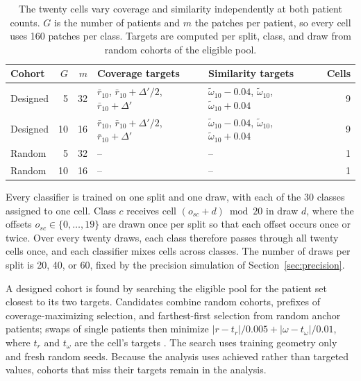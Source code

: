 \documentclass[11pt]{article}
\begin{document}
\begin{table}[htbp]
\centering
\renewcommand{\arraystretch}{1.15}
\begin{tabularx}{\textwidth}{@{}lrrYYr@{}}
\toprule
Cohort & $G$ & $m$ & Coverage targets & Similarity targets & Cells \\
\midrule
Designed & 5 & 32 & $\bar r_{10}$, $\bar r_{10}+\Delta'/2$, $\bar r_{10}+\Delta'$ & $\tilde\omega_{10}-0.04$, $\tilde\omega_{10}$, $\tilde\omega_{10}+0.04$ & 9 \\
Designed & 10 & 16 & $\bar r_{10}$, $\bar r_{10}+\Delta'/2$, $\bar r_{10}+\Delta'$ & $\tilde\omega_{10}-0.04$, $\tilde\omega_{10}$, $\tilde\omega_{10}+0.04$ & 9 \\
Random & 5 & 32 & -- & -- & 1 \\
Random & 10 & 16 & -- & -- & 1 \\
\bottomrule
\end{tabularx}
\caption{The twenty cells vary coverage and similarity independently at both patient counts. $G$ is the number of patients and $m$ the patches per patient, so every cell uses 160 patches per class. Targets are computed per split, class, and draw from random cohorts of the eligible pool.}
\label{tab:cells}
\end{table}

\noindent Every classifier is trained on one split and one draw, with each of the 30 classes assigned to one cell. Class $c$ receives cell $(o_{sc}+d)\bmod 20$ in draw $d$, where the offsets $o_{sc}\in\{0,\ldots,19\}$ are drawn once per split so that each offset occurs once or twice. Over every twenty draws, each class therefore passes through all twenty cells once, and each classifier mixes cells across classes. The number of draws per split is 20, 40, or 60, fixed by the precision simulation of Section~\ref{sec:precision}.

A designed cohort is found by searching the eligible pool for the patient set closest to its two targets. Candidates combine random cohorts, prefixes of coverage-maximizing selection, and farthest-first selection from random anchor patients; swaps of single patients then minimize $|r-t_r|/0.005+|\omega-t_\omega|/0.01$, where $t_r$ and $t_\omega$ are the cell's targets \citep{queisler2026coverageSimilarity}. The search uses training geometry only and fresh random seeds. Because the analysis uses achieved rather than targeted values, cohorts that miss their targets remain in the analysis.
\end{document}
